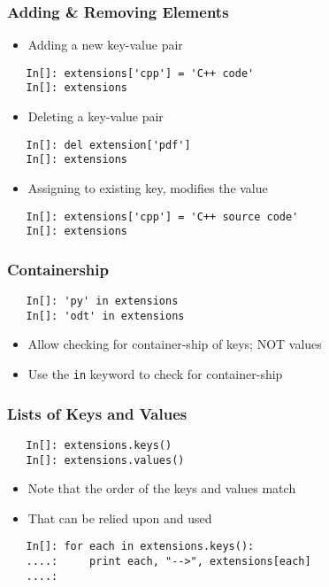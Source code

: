 \begin{frame}[fragile]
  \frametitle{Adding \& Removing Elements}
  \begin{itemize}
  \item Adding a new key-value pair
  \end{itemize}
  \begin{lstlisting}
   In[]: extensions['cpp'] = 'C++ code'
   In[]: extensions
  \end{lstlisting}
  \begin{itemize}
  \item Deleting a key-value pair
  \end{itemize}
  \begin{lstlisting}
   In[]: del extension['pdf']
   In[]: extensions
  \end{lstlisting}
  \begin{itemize}
  \item Assigning to existing key, modifies the value
  \end{itemize}
  \begin{lstlisting}
   In[]: extensions['cpp'] = 'C++ source code'
   In[]: extensions
  \end{lstlisting}
\end{frame}

\begin{frame}[fragile]
  \frametitle{Containership}
  \begin{lstlisting}
   In[]: 'py' in extensions
   In[]: 'odt' in extensions
  \end{lstlisting}
  \begin{itemize}
  \item Allow checking for container-ship of keys; NOT values
  \item Use the \texttt{in} keyword to check for container-ship
  \end{itemize}
\end{frame}

\begin{frame}[fragile]
  \frametitle{Lists of Keys and Values}
  \begin{lstlisting}
   In[]: extensions.keys()
   In[]: extensions.values()
  \end{lstlisting}
  \begin{itemize}
  \item Note that the order of the keys and values match
  \item That can be relied upon and used
  \end{itemize}
  \begin{lstlisting}
   In[]: for each in extensions.keys():
   ....:     print each, "-->", extensions[each]
   ....:
  \end{lstlisting}
\end{frame}

